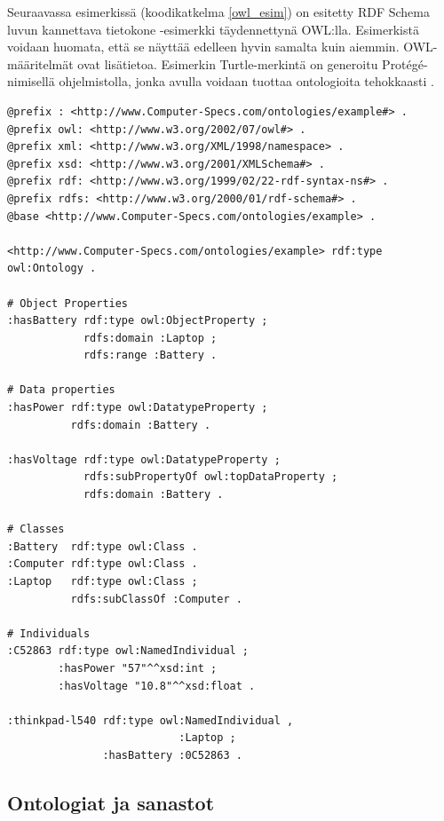 \documentclass[finnish, 12pt, a4paper, elec, utf8, pdfa, online]{aaltothesis}
\begin{document}
{Seuraavassa esimerkissä (koodikatkelma \ref{owl_esim}) on esitetty RDF Schema luvun kannettava tietokone -esimerkki täydennettynä OWL:lla. Esimerkistä voidaan huomata, että se näyttää edelleen hyvin samalta kuin aiemmin. OWL-määritelmät ovat lisätietoa. Esimerkin Turtle-merkintä on generoitu Protégé-nimisellä ohjelmistolla, jonka avulla voidaan tuottaa ontologioita tehokkaasti \cite{Protege}.

\vskip 0.75cm
\begin{lstlisting}[style=codeblock,caption={OWL esimerkki.},captionpos=b,label={owl_esim}]
@prefix : <http://www.Computer-Specs.com/ontologies/example#> .
@prefix owl: <http://www.w3.org/2002/07/owl#> .
@prefix xml: <http://www.w3.org/XML/1998/namespace> .
@prefix xsd: <http://www.w3.org/2001/XMLSchema#> .
@prefix rdf: <http://www.w3.org/1999/02/22-rdf-syntax-ns#> .
@prefix rdfs: <http://www.w3.org/2000/01/rdf-schema#> .
@base <http://www.Computer-Specs.com/ontologies/example> .

<http://www.Computer-Specs.com/ontologies/example> rdf:type owl:Ontology .

# Object Properties
:hasBattery rdf:type owl:ObjectProperty ;
            rdfs:domain :Laptop ;
            rdfs:range :Battery .

# Data properties
:hasPower rdf:type owl:DatatypeProperty ;
          rdfs:domain :Battery .

:hasVoltage rdf:type owl:DatatypeProperty ;
            rdfs:subPropertyOf owl:topDataProperty ;
            rdfs:domain :Battery .

# Classes
:Battery  rdf:type owl:Class .
:Computer rdf:type owl:Class .
:Laptop   rdf:type owl:Class ;
          rdfs:subClassOf :Computer .

# Individuals
:C52863 rdf:type owl:NamedIndividual ;
        :hasPower "57"^^xsd:int ;
        :hasVoltage "10.8"^^xsd:float .

:thinkpad-l540 rdf:type owl:NamedIndividual ,
                           :Laptop ;
               :hasBattery :0C52863 .

\end{lstlisting}
\vskip 0.75cm

\subsection{Ontologiat ja sanastot}

}
\end{document}
